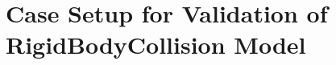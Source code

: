 \chapter{Case Setup for Validation of RigidBodyCollision Model}\label{app1:case}
\inputminted[fontsize=\scriptsize]{python}{PoC.py}

